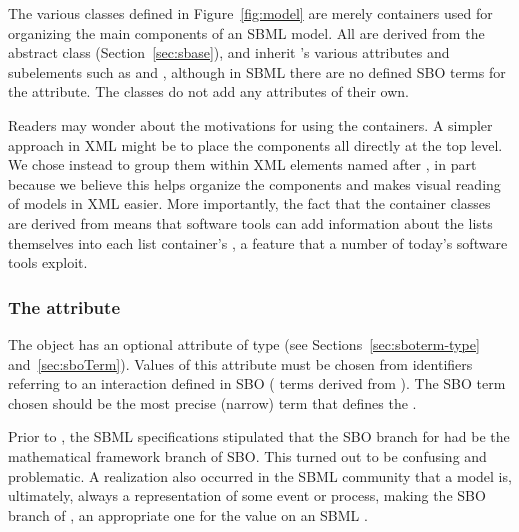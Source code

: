 The various \ListOf classes defined in Figure~\ref{fig:model} are
merely containers used for organizing the main components of an
SBML model.  All are derived from the abstract class \SBase
(Section~\ref{sec:sbase}), and inherit \SBase's various attributes
and subelements such as  and ,
although in SBML \thisLVR there are no defined SBO terms for the
 attribute.  The \ListOf classes do not add any
attributes of their own.

Readers may wonder about the motivations for using the \ListOf
containers.  A simpler approach in XML might be to place the
components all directly at the top level.  We chose instead to
group them within XML elements named after
, in part because we believe this helps
organize the components and makes visual reading of
models in XML easier.  More importantly, the fact that
the container classes are derived from \SBase means that software
tools can add information about the lists themselves into each
list container's , a feature that a number of
today's software tools exploit.


\subsubsection{The  attribute}
\label{sec:model-sboterm}

The \Model object has an optional  attribute of
type  (see Sections~\ref{sec:sboterm-type}
and~\ref{sec:sboTerm}).  Values of this attribute must be chosen
from identifiers referring to an interaction defined in SBO (\ie
terms derived from \changed{\sbointeraction}).  The SBO term
chosen should be the most precise (narrow) term that defines the
.

\begin{blockChanged}

Prior to \sbmltwofour, the SBML specifications stipulated that the
SBO branch for \Model had be the mathematical framework
branch of SBO.  This turned out to be confusing and problematic.
A realization also occurred in the SBML community that a
model is, ultimately, always a representation of some event or
process, making the SBO branch of \sbointeraction, an
appropriate one for the  value on an SBML \Model.

\end{blockChanged}

